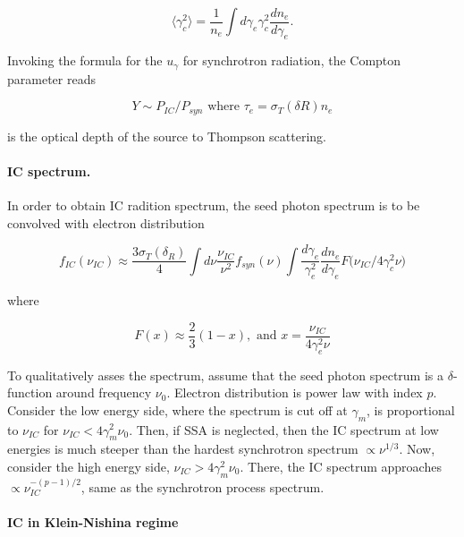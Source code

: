 \begin{equation}
\langle \gamma_c^2\rangle = \frac{1}{n_e} \int d\gamma_e \gamma_c^2\frac{dn_e}{d\gamma_e}.
\end{equation}

Invoking the formula  for the $u_{\gamma}$ for synchrotron radiation, the Compton parameter reads 

\begin{equation}
Y \sim P_{IC} / P_{syn} \text{ where } \tau_e = \sigma_T (\delta R) n_e
\end{equation}

is the optical depth of the source to Thompson scattering.

\paragraph{IC spectrum.}

In order to obtain IC radition spectrum, the seed photon spectrum is to be convolved with electron distribution \citep{RybickiLightman:1985}

\begin{equation}
f_{IC}(\nu_{IC}) \approx \frac{3\sigma_T (\delta_R)}{4} \int d\nu \frac{\nu_{IC}}{\nu^2}f_{syn}(\nu) \int \frac{d\gamma_e}{\gamma_e^2}\frac{dn_e}{d\gamma_e}F\big( \nu_{IC} / 4 \gamma_c^2\nu \big)
\end{equation}

where 

\begin{equation}
F(x) \approx \frac{2}{3}(1-x), \text{ and } x = \frac{\nu_{IC}}{4\gamma_e^2\nu}
\end{equation}

To qualitatively asses the spectrum, assume that the seed photon spectrum is a $\delta$-function around frequency $\nu_0$. Electron distribution is power law with index $p$.
Consider the low energy side, where the spectrum is cut off at $\gamma_m$, is proportional to $\nu_{IC}$ for $\nu_{IC} < 4\gamma_m^2\nu_0$. Then, if \ac{SSA} is neglected, then the \ac{IC} spectrum at low energies is much steeper than the hardest synchrotron spectrum $\propto\nu^{1/3}$.
Now, consider the high energy side, $\nu_{IC} > 4 \gamma_m^2\nu_0$. There, the \ac{IC} spectrum approaches $\propto \nu_{IC}^{-(p-1)/2}$, same as the synchrotron process spectrum.

\paragraph{IC in Klein-Nishina regime}

